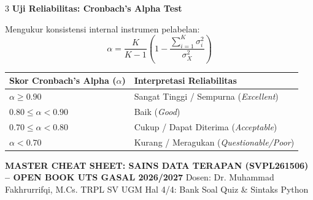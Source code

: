 \documentclass[6.8pt,landscape,a4paper]{extarticle}
\newcommand{\sdtSub}[1]{%
    \vspace{0.5pt}%
    \noindent\textbf{\fontsize{5.8pt}{6.8pt}\selectfont\color{sdtBlue}#1}\vspace{0.1pt}%
}
\begin{document}
\begin{multicols}{3}
\sdtSub{Uji Reliabilitas: Cronbach's Alpha Test}
Mengukur konsistensi internal instrumen pelabelan:
$$\alpha = \frac{K}{K - 1} \left( 1 - \frac{\sum_{i=1}^K \sigma_i^2}{\sigma_X^2} \right)$$
\begin{center}
{\fontsize{4.8pt}{5.8pt}\selectfont
\begin{tabular}{@{}ll@{}}
\toprule
\textbf{Skor Cronbach's Alpha ($\alpha$)} & \textbf{Interpretasi Reliabilitas} \\
\midrule
$\alpha \geq 0.90$ & Sangat Tinggi / Sempurna (\textit{Excellent}) \\
$0.80 \leq \alpha < 0.90$ & Baik (\textit{Good}) \\
$0.70 \leq \alpha < 0.80$ & Cukup / Dapat Diterima (\textit{Acceptable}) \\
$\alpha < 0.70$ & Kurang / Meragukan (\textit{Questionable/Poor}) \\
\bottomrule
\end{tabular}}
\end{center}

\end{multicols}

\clearpage

\noindent\colorbox{sdtNavy}{%
    \parbox{\dimexpr\textwidth-2\fboxsep\relax}{%
        \color{white}%
        \textbf{\fontsize{7.8pt}{8.8pt}\selectfont MASTER CHEAT SHEET: SAINS DATA TERAPAN (SVPL261506) -- OPEN BOOK UTS GASAL 2026/2027}%
        \hfill%
        \fontsize{5.8pt}{6.8pt}\selectfont Dosen: Dr. Muhammad Fakhrurrifqi, M.Cs. \textbar{} TRPL SV UGM \textbar{} Hal 4/4: Bank Soal Quiz \& Sintaks Python%
    }%
}
\vspace{0.2mm}
\end{document}
